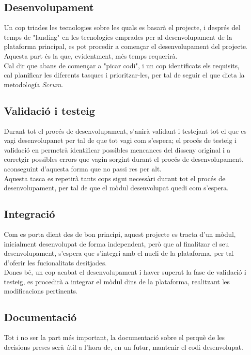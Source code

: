 \subsection{Desenvolupament}
Un cop triades les tecnologies sobre les quals es basarà el projecte, i després del temps de "landing" en les tecnologíes emprades per al desenvolupament de la plataforma principal, es pot procedir a començar el desenvolupament del projecte.\\
\newline Aquesta part és la que, evidentment, més temps requerirà.\\
Cal dir que abans de començar a "picar codi", i un cop identificats els requisits, cal planificar les diferents tasques i prioritzar-les, per tal de seguir el que dicta la metodología \textit{Scrum}.

\subsection{Validació i testeig}
Durant tot el procés de desenvolupament, s'anirà validant i testejant tot el que es vagi desenvolupanet per tal de que tot vagi com s'espera; el procés de testeig i validació en permetrà identificar possibles mencances del disseny original i a corretgir possibles errors que vagin sorgint durant el procés de desenvolupament, aconseguint d'aquesta forma que no passi res per alt.\\
\newline Aquesta tasca es  repetirà tants cops sigui necessàri durant tot el procés de desenvolupament, per tal de que el mòdul desenvolupat quedi com s'espera.

\subsection{Integració}
Com es porta dient des de bon principi, aquest projecte es tracta d'un mòdul, inicialment desenvolupat de forma independent, però que al finalitzar el seu desenvolupament, s'espera que s'integri amb el nucli de la plataforma, per tal d'oferir les fucionalitats desitjades.\\
\newline Doncs bé, un cop acabat el desenvolupament i haver superat la fase de validació i testeig, es procedirà a integrar el mòdul dins de la plataforma, realitzant les modificacions pertinents.

\subsection{Documentació}
Tot i no ser la part més important, la documentació sobre el perquè de les decisions preses serà útil a l'hora de, en un futur, mantenir el codi desenvolupat.



